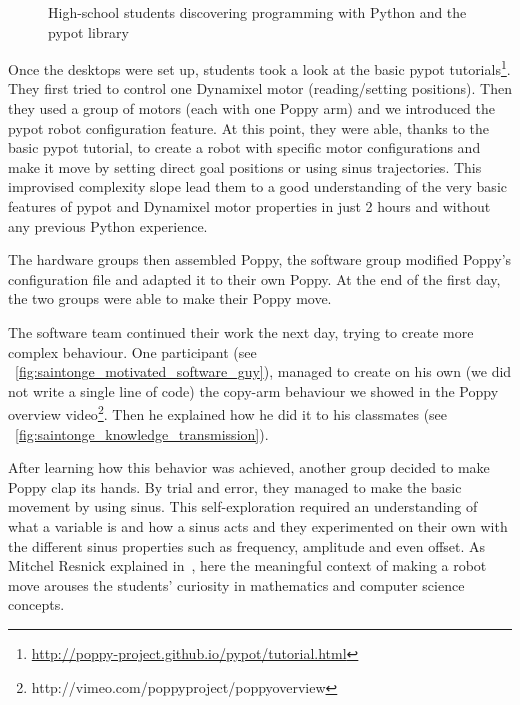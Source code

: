 \begin{figure}[tb]
\centering
    \hfill
    \hfill
    \hfill
    \caption{High-school students discovering programming with Python and the pypot library}
    \label{fig:saintonge_software}
\end{figure}

Once the desktops were set up, students took a look at the basic pypot tutorials\footnote{\url{http://poppy-project.github.io/pypot/tutorial.html}}. They first tried to control one Dynamixel motor (reading/setting positions). Then they used a group of motors (each with one Poppy arm) and we introduced the pypot robot configuration feature. At this point, they were able, thanks to the basic pypot tutorial, to create a robot with specific motor configurations and make it move by setting direct goal positions or using sinus trajectories. This improvised complexity slope lead them to a good understanding of the very basic features of pypot and Dynamixel motor properties in just 2 hours and without any previous Python experience.

The hardware groups then assembled Poppy, the software group modified Poppy's configuration file and adapted it to their own Poppy. At the end of the first day, the two groups were able to make their Poppy move.

The software team continued their work the next day, trying to create more complex behaviour. One participant (see \figurename~\ref{fig:saintonge_motivated_software_guy}), managed to create on his own (we did not write a single line of code) the copy-arm behaviour we showed in the Poppy overview video\footnote{http://vimeo.com/poppyproject/poppyoverview}. Then he explained how he did it to his classmates (see \figurename~\ref{fig:saintonge_knowledge_transmission}).

After learning how this behavior was achieved, another group decided to make Poppy clap its hands. By trial and error, they managed to make the basic movement by using sinus. This self-exploration required an understanding of what a variable is and how a sinus acts and they experimented on their own with the different sinus properties such as frequency, amplitude and even offset. As Mitchel Resnick explained in~\parencite{resnick2009scratch}, here the meaningful context of making a robot move arouses the students’ curiosity in mathematics and computer science concepts.



